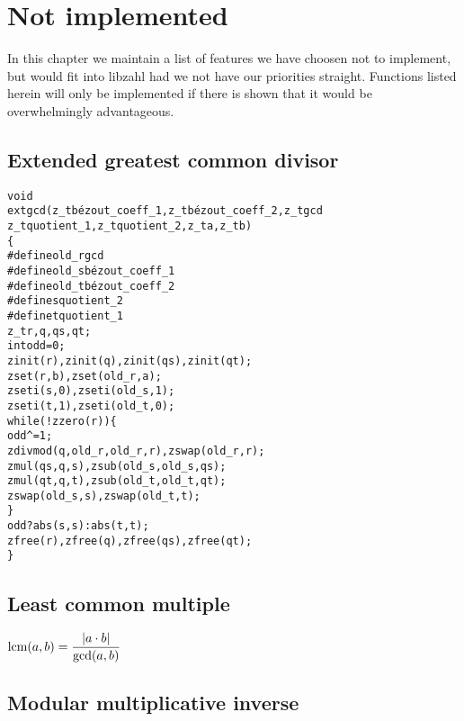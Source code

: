 \chapter{Not implemented}
\label{chap:Not implemented}

In this chapter we maintain a list of
features we have choosen not to implement,
but would fit into libzahl had we not have
our priorities straight. Functions listed
herein will only be implemented if there
is shown that it would be overwhelmingly
advantageous.

\vspace{1cm}
\minitoc


\newpage
\section{Extended greatest common divisor}
\label{sec:Extended greatest common divisor}

\begin{alltt}
void
extgcd(z_t bézout_coeff_1, z_t bézout_coeff_2, z_t gcd
       z_t quotient_1, z_t quotient_2, z_t a, z_t b)
\{
#define old_r gcd
#define old_s bézout_coeff_1
#define old_t bézout_coeff_2
#define s quotient_2
#define t quotient_1
    z_t r, q, qs, qt;
    int odd = 0;
    zinit(r), zinit(q), zinit(qs), zinit(qt);
    zset(r, b), zset(old_r, a);
    zseti(s, 0), zseti(old_s, 1);
    zseti(t, 1), zseti(old_t, 0);
    while (!zzero(r)) \{
        odd ^= 1;
        zdivmod(q, old_r, old_r, r), zswap(old_r, r);
        zmul(qs, q, s), zsub(old_s, old_s, qs);
        zmul(qt, q, t), zsub(old_t, old_t, qt);
        zswap(old_s, s), zswap(old_t, t);
    \}
    odd ? abs(s, s) : abs(t, t);
    zfree(r), zfree(q), zfree(qs), zfree(qt);
\}
\end{alltt}


\newpage
\section{Least common multiple}
\label{sec:Least common multiple}

\( \displaystyle{
    \mbox{lcm}(a, b) = {\lvert a \cdot b \rvert \over \mbox{gcd}(a, b)}
}\)


\newpage
\section{Modular multiplicative inverse}
\label{sec:Modular multiplicative inverse}

